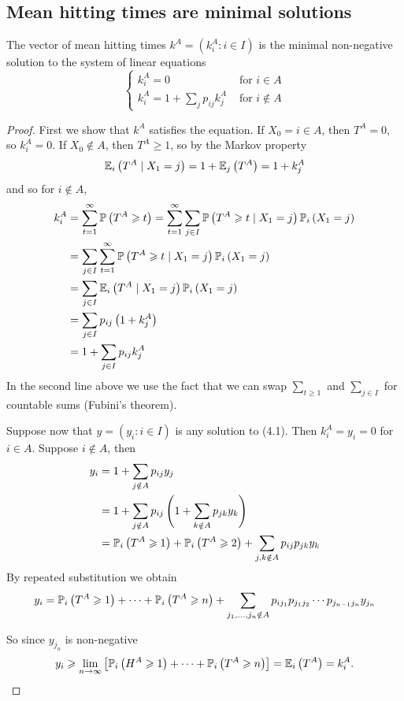 \documentclass[a4paper]{article}
\begin{document}
\subsection{Mean hitting times are minimal solutions}
\begin{theorem}
    The vector of mean hitting times $k^{A}=\left(k_{i}^{A}: i \in I\right)$ is the minimal non-negative solution to the system of linear equations
    \[
    \begin{cases}k_{i}^{A}=0 & \text { for } i \in A \\ k_{i}^{A}=1+\sum_{j} p_{i j} k_{j}^{A} & \text { for } i \notin A\end{cases}
    \]
\end{theorem}
\begin{proof}
    First we show that $k^{A}$ satisfies the equation. If $X_{0}=i \in A$, then $T^{A}=0$, so $k_{i}^{A}=0$. If $X_{0} \notin A$, then $T^{A} \geq 1$, so by the Markov property
    \[
    {\mathbb{E}}_{i}\left(T^{A} \mid X_{1}=j\right)=1+{\mathbb{E}}_{j}\left(T^{A}\right)=1+k_{j}^{A}
    \]
    and so for $i \notin A$,
    \[
    \begin{aligned}
    k_{i}^{A} &=\sum_{t=1}^{\infty} {\mathbb{P}}\left(T^{A} \geqslant t\right)=\sum_{t=1}^{\infty} \sum_{j \in I} {\mathbb{P}}\left(T^{A} \geqslant t \mid X_{1}=j\right) {\mathbb{P}}_{i}\left(X_{1}=j\right) \\
    &=\sum_{j \in I} \sum_{t=1}^{\infty} {\mathbb{P}}\left(T^{A} \geqslant t \mid X_{1}=j\right) {\mathbb{P}}_{i}\left(X_{1}=j\right) \\
    &=\sum_{j \in I} {\mathbb{E}}_{i}\left(T^{A} \mid X_{1}=j\right) {\mathbb{P}}_{i}\left(X_{1}=j\right) \\
    &=\sum_{j \in I} p_{i j}\left(1+k_{j}^{A}\right) \\
    &=1+\sum_{j \in I} p_{i j} k_{j}^{A}
    \end{aligned}
    \]
    In the second line above we use the fact that we can swap $\sum_{t \geq 1}$ and $\sum_{j \in I}$ for countable sums (Fubini's theorem).

    Suppose now that $y=\left(y_{i}: i \in I\right)$ is any solution to (4.1). Then $k_{i}^{A}=y_{i}=0$ for $i \in A$. Suppose $i \notin A$, then
    \[
    \begin{aligned}
    y_{i} &=1+\sum_{j \notin A} p_{i j} y_{j} \\
    &=1+\sum_{j \notin A} p_{i j}\left(1+\sum_{k \notin A} p_{j k} y_{k}\right) \\
    &={\mathbb{P}}_{i}\left(T^{A} \geqslant 1\right)+{\mathbb{P}}_{i}\left(T^{A} \geqslant 2\right)+\sum_{j, k \notin A} p_{i j} p_{j k} y_{k}
    \end{aligned}
    \]
    By repeated substitution we obtain
    \[
    y_{i}={\mathbb{P}}_{i}\left(T^{A} \geqslant 1\right)+\cdots+{\mathbb{P}}_{i}\left(T^{A} \geqslant n\right)+\sum_{j_{1}, \ldots, j_{n} \notin A} p_{i j_{1}} p_{j_{1} j_{2}} \cdots p_{j_{n-1} j_{n}} y_{j_{n}}
    \]

    So since $y_{j_{n}}$ is non-negative
    \[
    y_{i} \geqslant \lim _{n \rightarrow \infty}\left[{\mathbb{P}}_{i}\left(H^{A} \geqslant 1\right)+\cdots+{\mathbb{P}}_{i}\left(T^{A} \geqslant n\right)\right]={\mathbb{E}}_{i}\left(T^{A}\right)=k_{i}^{A}.
    \]
\end{proof}
\end{document}
